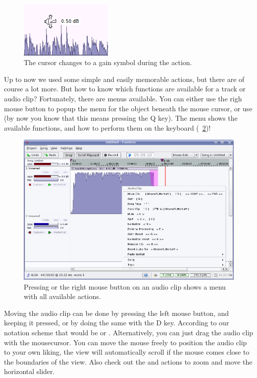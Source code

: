 \begin{figure}
 \centering\includegraphics[width=0.4\textwidth]{images/gain-cursor.png}
 \caption{The cursor changes to a gain symbol during the  action.}
 \label{fig_gaincursor}
\end{figure}

Up to now we used some simple and easily memorable actions, but there are of course a lot more. But how to know which functions are available for a track or audio clip? Fortunately, there are menus available. You can either use the righ mouse button to popup the menu for the object beneath the mouse cursor, or use  (by now you know that this means pressing the Q key). The menu shows the available functions, and how to perform them on the keyboard (\FigB\ \ref{fig_clipmenu})!

\begin{figure}
 \centering\includegraphics[width=\textwidth]{images/clipmenu.png}
 \caption{Pressing  or the right mouse button on an audio clip shows a menu with all available actions.}
 \label{fig_clipmenu}
\end{figure}

Moving the audio clip can be done by pressing the left mouse button, and keeping it pressed, or by doing the same with the D key. According to our notation scheme that would be  or . Alternatively, you can just drag the audio clip with the mousecursor. You can move the mouse freely to position the audio clip to your own liking, the view will automatically scroll if the mouse comes close to the boundaries of the view. Also check out the  and  actions to zoom and move the horizontal slider.


